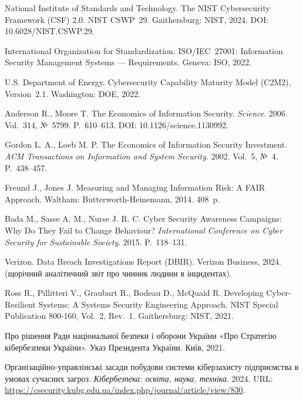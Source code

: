 
 National Institute of Standards and Technology. The NIST Cybersecurity Framework (CSF) 2.0. NIST CSWP~29. Gaithersburg: NIST, 2024. DOI: 10.6028/NIST.CSWP.29.

 International Organization for Standardization. ISO/IEC~27001: Information Security Management Systems --- Requirements. Geneva: ISO, 2022.

 U.S. Department of Energy. Cybersecurity Capability Maturity Model (C2M2), Version~2.1. Washington: DOE, 2022.

 Anderson R., Moore T. The Economics of Information Security. \emph{Science}. 2006. Vol.~314, №~5799. P.~610--613. DOI: 10.1126/science.1130992.

 Gordon L. A., Loeb M. P. The Economics of Information Security Investment. \emph{ACM Transactions on Information and System Security}. 2002. Vol.~5, №~4. P.~438--457.

 Freund J., Jones J. Measuring and Managing Information Risk: A FAIR Approach. Waltham: Butterworth-Heinemann, 2014. 408~p.

 Bada M., Sasse A. M., Nurse J. R. C. Cyber Security Awareness Campaigns: Why Do They Fail to Change Behaviour? \emph{International Conference on Cyber Security for Sustainable Society}. 2015. P.~118--131.

 Verizon. Data Breach Investigations Report (DBIR). Verizon Business, 2024. (щорічний аналітичний звіт про чинник людини в інцидентах).

 Ross R., Pillitteri V., Graubart R., Bodeau D., McQuaid R. Developing Cyber-Resilient Systems: A Systems Security Engineering Approach. NIST Special Publication 800-160, Vol.~2, Rev.~1. Gaithersburg: NIST, 2021.

 Про рішення Ради національної безпеки і оборони України «Про Стратегію кібербезпеки України». Указ Президента України. Київ, 2021.

 Організаційно-управлінські засади побудови системи кіберзахисту підприємства в умовах сучасних загроз. \emph{Кібербезпека: освіта, наука, техніка}. 2024. URL: \url{https://csecurity.kubg.edu.ua/index.php/journal/article/view/830}.
